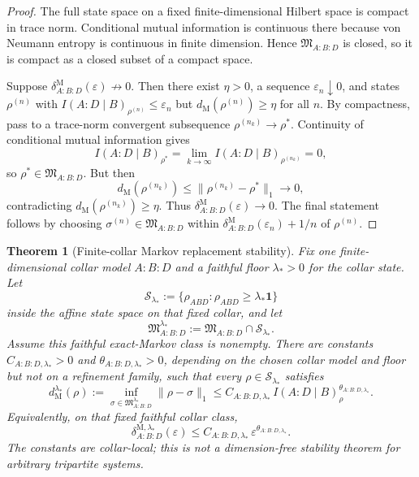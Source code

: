\documentclass[11pt]{article}
\newtheorem{theorem}{Theorem}[section]
\begin{document}
\begin{proof}
The full state space on a fixed finite-dimensional Hilbert space is compact in trace norm. Conditional mutual information is continuous there because von Neumann entropy is continuous in finite dimension. Hence \(\mathfrak M_{A:B:D}\) is closed, so it is compact as a closed subset of a compact space.

Suppose \(\delta^{\mathrm M}_{A:B:D}(\varepsilon)\not\to 0\). Then there exist \(\eta>0\), a sequence \(\varepsilon_n\downarrow 0\), and states \(\rho^{(n)}\) with \(I(A:D\mid B)_{\rho^{(n)}}\le \varepsilon_n\) but \(d_{\mathrm M}(\rho^{(n)})\ge \eta\) for all \(n\). By compactness, pass to a trace-norm convergent subsequence \(\rho^{(n_k)}\to \rho^\ast\). Continuity of conditional mutual information gives
\[
I(A:D\mid B)_{\rho^\ast}
=
\lim_{k\to\infty} I(A:D\mid B)_{\rho^{(n_k)}}
=
0,
\]
so \(\rho^\ast\in \mathfrak M_{A:B:D}\). But then
\[
d_{\mathrm M}(\rho^{(n_k)})
\le
\|\rho^{(n_k)}-\rho^\ast\|_1
\longrightarrow 0,
\]
contradicting \(d_{\mathrm M}(\rho^{(n_k)})\ge \eta\). Thus \(\delta^{\mathrm M}_{A:B:D}(\varepsilon)\to 0\). The final statement follows by choosing \(\sigma^{(n)}\in\mathfrak M_{A:B:D}\) within \(\delta^{\mathrm M}_{A:B:D}(\varepsilon_n)+1/n\) of \(\rho^{(n)}\).
\end{proof}

\begin{theorem}[Finite-collar Markov replacement stability]\label{thm:finite-collar-markov-stability}
Fix one finite-dimensional collar model \(A:B:D\) and a faithful floor
\(\lambda_\ast>0\) for the collar state. Let
\[
\mathcal S_{\lambda_\ast}
:=
\{\rho_{ABD}:\rho_{ABD}\ge \lambda_\ast\mathbf 1\}
\]
inside the affine state space on that fixed collar, and let
\[
\mathfrak M_{A:B:D}^{\lambda_\ast}:=
\mathfrak M_{A:B:D}\cap \mathcal S_{\lambda_\ast}.
\]
Assume this faithful exact-Markov class is nonempty. There are constants \(C_{A:B:D,\lambda_\ast}>0\) and
\(\theta_{A:B:D,\lambda_\ast}>0\), depending on the chosen collar model and
floor but not on a refinement family, such that every
\(\rho\in\mathcal S_{\lambda_\ast}\) satisfies
\[
d_{\mathrm M}^{\lambda_\ast}(\rho)
:=
\inf_{\sigma\in\mathfrak M_{A:B:D}^{\lambda_\ast}}
\|\rho-\sigma\|_1
\le
C_{A:B:D,\lambda_\ast}\,
I(A:D\mid B)_\rho^{\theta_{A:B:D,\lambda_\ast}}.
\]
Equivalently, on that fixed faithful collar class,
\[
\delta^{\mathrm M,\lambda_\ast}_{A:B:D}(\varepsilon)
\le
C_{A:B:D,\lambda_\ast}\,\varepsilon^{\theta_{A:B:D,\lambda_\ast}}.
\]
The constants are collar-local; this is not a dimension-free stability theorem
for arbitrary tripartite systems.
\end{theorem}
\end{document}
